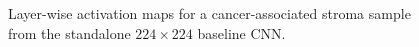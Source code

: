 \begin{figure}[htbp]
    \centering
    
    \caption{Layer-wise activation maps for a cancer-associated stroma sample
    from the standalone $224 \times 224$ baseline CNN.}
    \label{fig:baseline224-stroma-feature-maps}
\end{figure}
